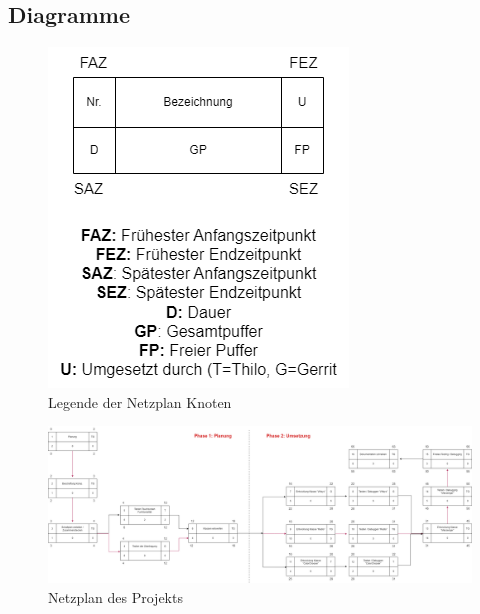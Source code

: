 \documentclass[a4paper, 11pt]{scrartcl}
\begin{document}
\begin{small}
\subsection{Diagramme}\label{ch:diags}
\begin{figure}[H]
    \begin{center}
        \includegraphics[scale=0.7]{Bilder/netzplan_legende.png}
        \caption{Legende der Netzplan Knoten}\label{diag:netzplan_legende}
    \end{center}
\end{figure}

\begin{figure}[H]
    \begin{center}
        \includegraphics[scale=0.21]{Bilder/Netzplan.png}
        \caption{Netzplan des Projekts}\label{diag:netzplan}
    \end{center}
\end{figure}


\end{small}
\end{document}
